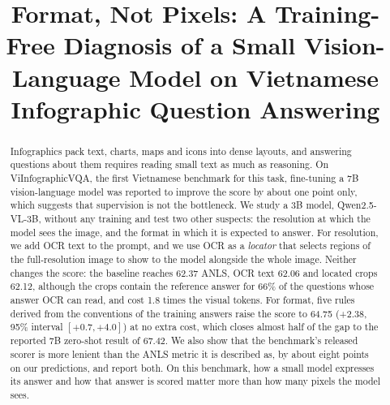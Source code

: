 \documentclass[conference]{IEEEtran}
\begin{document}
\title{Format, Not Pixels: A Training-Free Diagnosis of a Small Vision-Language Model on Vietnamese Infographic Question Answering}

\author{
\and
{}
}

\maketitle

\begin{abstract}
Infographics pack text, charts, maps and icons into dense layouts, and answering questions about them requires reading small text as much as reasoning. On ViInfographicVQA, the first Vietnamese benchmark for this task, fine-tuning a 7B vision-language model was reported to improve the score by about one point only, which suggests that supervision is not the bottleneck. We study a 3B model, Qwen2.5-VL-3B, without any training and test two other suspects: the resolution at which the model sees the image, and the format in which it is expected to answer. For resolution, we add OCR text to the prompt, and we use OCR as a \emph{locator} that selects regions of the full-resolution image to show to the model alongside the whole image. Neither changes the score: the baseline reaches 62.37 ANLS, OCR text 62.06 and located crops 62.12, although the crops contain the reference answer for 66\% of the questions whose answer OCR can read, and cost 1.8 times the visual tokens. For format, five rules derived from the conventions of the training answers raise the score to 64.75 (+2.38, 95\% interval $[+0.7, +4.0]$) at no extra cost, which closes almost half of the gap to the reported 7B zero-shot result of 67.42. We also show that the benchmark's released scorer is more lenient than the ANLS metric it is described as, by about eight points on our predictions, and report both. On this benchmark, how a small model expresses its answer and how that answer is scored matter more than how many pixels the model sees.
\end{abstract}
\end{document}
